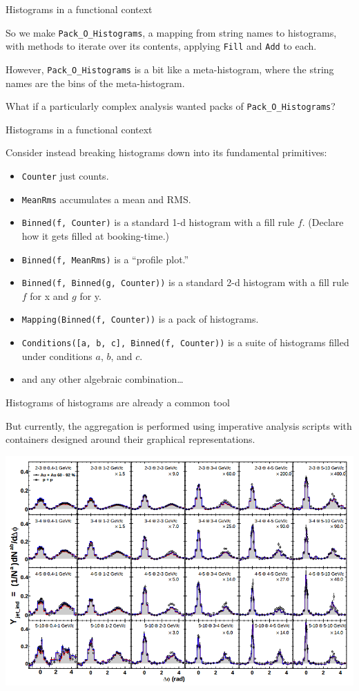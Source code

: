 \documentclass{beamer}
\begin{document}
\begin{frame}{Histograms in a functional context}

So we make {\tt Pack\_O\_Histograms}, a mapping from string names to histograms, with methods to iterate over its contents, applying {\tt Fill} and {\tt Add} to each.

\vfill
However, {\tt Pack\_O\_Histograms} is a bit like a meta-histogram, where the string names are the bins of the meta-histogram.

\vfill
What if a particularly complex analysis wanted packs of {\tt Pack\_O\_Histograms}?
\end{frame}

\begin{frame}{Histograms in a functional context}

Consider instead breaking histograms down into its fundamental primitives:
\begin{itemize}
\item {\tt Counter} just counts.
\item {\tt MeanRms} accumulates a mean and RMS.
\item {\tt Binned(f, Counter)} is a standard 1-d histogram with a fill rule $f$. (Declare how it gets filled at booking-time.)
\item {\tt Binned(f, MeanRms)} is a ``profile plot.''
\item {\tt Binned(f, Binned(g, Counter))} is a standard 2-d histogram with a fill rule $f$ for x and $g$ for y.
\item {\tt Mapping(Binned(f, Counter))} is a pack of histograms.
\item {\tt Conditions([a, b, c], Binned(f, Counter))} is a suite of histograms filled under conditions $a$, $b$, and $c$.
\item and any other algebraic combination\ldots
\end{itemize}
\end{frame}

\begin{frame}{Histograms of histograms are already a common tool}

But currently, the aggregation is performed using imperative analysis scripts with containers designed around their graphical representations.

\includegraphics[width=\linewidth]{histograms_of_histograms.png}
\end{frame}
\end{document}
